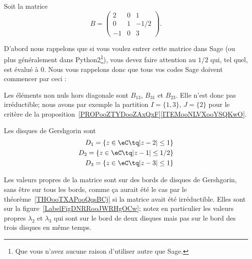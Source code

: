 \begin{example}     \label{EXooUKQIooQqteHx}

	Soit la matrice
	\begin{equation}
		B=\begin{pmatrix}
			2  & 0 & 1    \\
			0  & 1 & -1/2 \\
			-1 & 0 & 3
		\end{pmatrix}.
	\end{equation}

	D'abord nous rappelons que si vous voulez entrer cette matrice dans Sage (ou plus généralement dans Python2\footnote{Que vous n'avez aucune raison d'utiliser autre que Sage.}), vous devez faire attention au \( 1/2\) qui, tel quel, est évalué à \( 0\). Nous vous rappelons donc que tous vos codes Sage doivent commencer par ceci :

	

	Les éléments non nuls hors diagonale sont \( B_{13}\), \( B_{31}\) et \( B_{23}\). Elle n'est donc pas irréductible; nous avons par exemple la partition \( I=\{ 1,3 \}\), \( J=\{ 2 \}\) pour le critère de la proposition~\ref{PROPooZTYDooZAxQxF}\ref{ITEMooNLVXooYSQKwO}.

	Les disques de Gershgorin sont
	\begin{subequations}
		\begin{align}
			D_1=\{ z\in \eC\tq | z-2 |\leq 1 \}   \\
			D_2=\{ z\in \eC\tq | z-1 |\leq 1/2 \} \\
			D_3=\{ z\in \eC\tq | z-3 |\leq 1 \}
		\end{align}
	\end{subequations}

	Les valeurs propres de la matrice sont sur des bords de disques de Gershgorin, sans être sur tous les bords, comme ça aurait été le cas par le théorème~\ref{THOooTXAPooQqsBCj} si la matrice avait été irréductible. Elles sont sur la figure~\ref{LabelFigDNRRooJWRHgOCw}; notez en particulier les valeurs propres \( \lambda_2\) et \( \lambda_3\) qui sont sur le bord de deux disques mais pas sur le bord des trois disques en même temps.

	\newcommand{\CaptionFigDNRRooJWRHgOCw}{Les disques de Gershgorin et les valeurs propres pour l'exemple~\ref{EXooUKQIooQqteHx}.}
	

\end{example}

